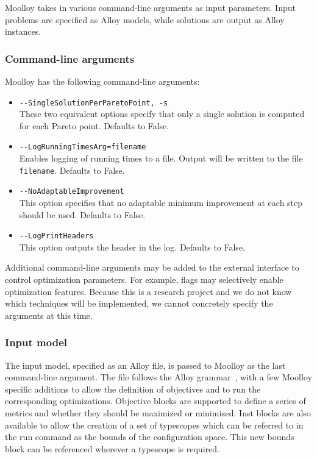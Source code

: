 \documentclass[11pt]{article}
\theoremstyle{definition}
\begin{document}
Moolloy takes in various command-line arguments as input parameters.
Input problems are specified as Alloy models, while solutions are
output as Alloy instances.

\subsubsection{Command-line arguments}\label{sec:cl_args}

Moolloy has the following command-line arguments:

\begin{itemize}
  \item \verb|--SingleSolutionPerParetoPoint, -s|\\
  These two equivalent options specify that only a single solution is
  computed for each Pareto point. Defaults to False.


  \item \verb|--LogRunningTimesArg=filename|\\
  Enables logging of running times to a file. Output will be written to the
  file \texttt{filename}. Defaults to False.

  \item \verb|--NoAdaptableImprovement|\\
  This option specifies that no adaptable minimum improvement at each
  step should be used. Defaults to False.

  \item \verb|--LogPrintHeaders|\\
  This option outputs the header in the log. Defaults to False.
\end{itemize}

Additional command-line arguments may be added to the external
interface to control optimization parameters. For example, flags may
selectively enable optimization features. Because this is a research
project and we do not know which techniques will be implemented, we
cannot concretely specify the arguments at this time.

\subsubsection{Input model}\label{sec:in_model}

The input model, specified as an Alloy file, is passed to Moolloy as
the last command-line argument. The file follows the Alloy
grammar~\cite{ref:alloy_grammar}, with a few Moolloy specific additions
to allow the definition of objectives and to run the corresponding
optimizations. Objective blocks are supported to define a series of
metrics and whether they should be maximized or minimized. Inst blocks
are also available to allow the creation of a set of typescopes which
can be referred to in the run command as the bounds of the
configuration space. This new bounds block can be referenced wherever a
typescope is required.
\end{document}
